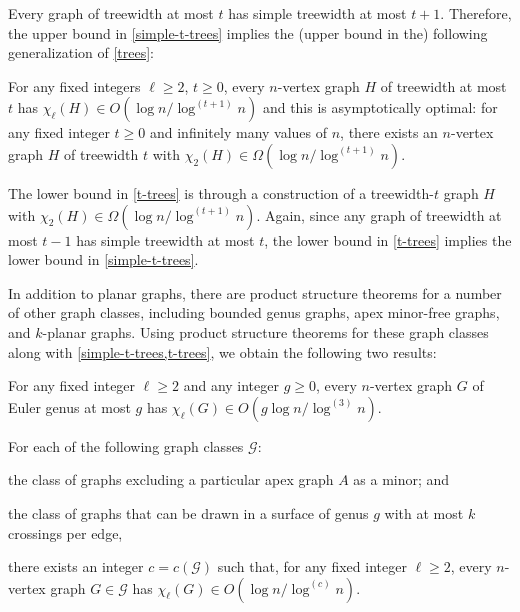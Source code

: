 \documentclass[kpfonts]{patmorin}
\newcommand{\trn}{\chi_2}
\newcommand{\lrn}{\chi_{\ell}}
\theoremstyle{named}
\begin{document}
Every graph of treewidth at most $t$ has simple treewidth at most $t+1$. Therefore, the upper bound in \cref{simple-t-trees} implies the (upper bound in the) following generalization of \cref{trees}:

\begin{thm}\label{t-trees}
    For any fixed integers $\ell\ge 2$, $t\ge 0$, every $n$-vertex graph $H$ of treewidth at most $t$ has $\lrn(H) \in O(\log n/\log^{(t+1)} n)$ and this is asymptotically optimal: for any fixed integer $t\ge 0$ and infinitely many values of $n$, there exists an $n$-vertex graph $H$ of treewidth $t$ with $\trn(H)\in\Omega(\log n/\log^{(t+1)} n)$.
\end{thm}

The lower bound in \cref{t-trees} is through a construction of a treewidth-$t$ graph $H$ with $\trn(H)\in\Omega(\log n/\log^{(t+1)} n)$.  Again, since any graph of treewidth at most $t-1$ has simple treewidth at most $t$, the lower bound in \cref{t-trees} implies the lower bound in \cref{simple-t-trees}.

In addition to planar graphs, there are product structure theorems for a number of other graph classes, including bounded genus graphs, apex minor-free graphs, and $k$-planar graphs.  Using product structure theorems for these graph classes along with \cref{simple-t-trees,t-trees}, we obtain the following two results:

\begin{thm}\label{bounded-genus}
    For any fixed integer $\ell\ge 2$ and any integer $g\ge 0$, every $n$-vertex graph $G$ of Euler genus at most $g$ has $\lrn(G)\in O(g\log n/\log^{(3)} n)$.
\end{thm}

\begin{thm}\label{meta-theorem}\label{meta}
    For each of the following graph classes $\mathcal{G}$:
    \begin{compactenum}
        \item the class of graphs excluding a particular apex graph $A$ as a minor; and
        \item the class of graphs that can be drawn in a surface of genus $g$ with at most $k$ crossings per edge,
    \end{compactenum}
    there exists an integer $c=c(\mathcal{G})$ such that, for any fixed integer $\ell\ge 2$, every $n$-vertex graph $G\in\mathcal{G}$ has $\lrn(G)\in O(\log n/\log^{(c)} n)$.
\end{thm}
\end{document}
